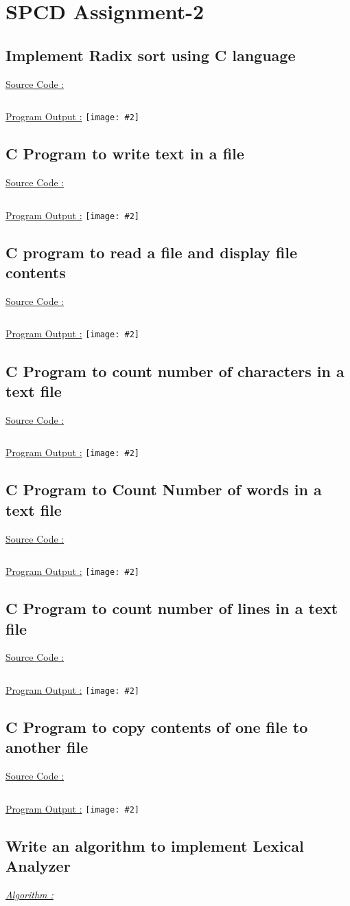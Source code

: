 \documentclass{report}
\newcommand{\problem}[3]{
  \section{#3}
    \underline{{\LARGE Source Code :}}
    \inputminted[breaklines,fontsize=\Large]{c}{#1.c}
    \bigbreak
    \noindent
    \underline{{\LARGE Program Output :}}
    \bigbreak
    \noindent
    \texttt{[image: \#2]}
}
\begin{document}

\newpage
\large{\tableofcontents}
\clearpage
{}

\chapter{SPCD Assignment-2}
\problem{../codes/Q01}{Q01}{Implement Radix sort using C language}
\problem{../codes/Q02}{Q02}{C Program to write text in a file}
\problem{../codes/Q03}{Q03}{C program to read a file and display file contents }
\problem{../codes/Q04}{Q04}{C Program to count number of characters in a text file}
\problem{../codes/Q05}{Q05}{C Program to Count Number of words in a text file}
\problem{../codes/Q06}{Q06}{C Program to count number of lines in a text file}
\problem{../codes/Q07}{Q07}{C Program to copy contents of one file to another file}

\section{Write an algorithm to implement Lexical Analyzer}
\bigbreak
\underline{\emph{\Large Algorithm :}}
\inputminted[breaklines]{c}{../codes/Q08.c}
\bigbreak
\end{document}
